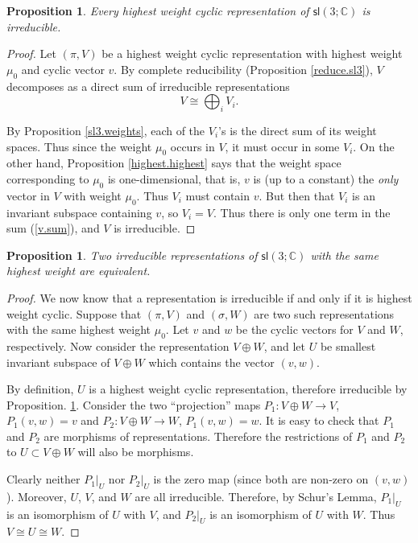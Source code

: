 \documentclass[12pt]{amsbook}
\theoremstyle{plain}
\newtheorem{proposition}[theorem]{Proposition}
\numberwithin{equation}{chapter}
\numberwithin{theorem}{chapter}
\begin{document}
\begin{proposition}
\label{highest.irred}Every highest weight cyclic representation of
$\mathsf{sl}\left(  3;\mathbb{C}\right)  $ is irreducible.
\end{proposition}

\begin{proof}
Let $\left(  \pi,V\right)  $ be a highest weight cyclic representation with
highest weight $\mu_{0}$ and cyclic vector $v$. By complete reducibility
(Proposition \ref{reduce.sl3}), $V$ decomposes as a direct sum of irreducible
representations
\begin{equation}
V\cong\bigoplus_{i}V_{i}\text{.}\label{v.sum}%
\end{equation}

By Proposition \ref{sl3.weights}, each of the $V_{i}$'s is the direct sum of
its weight spaces. Thus since the weight $\mu_{0}$ occurs in $V$, it must
occur in some $V_{i}$. On the other hand, Proposition \ref{highest.highest}
says that the weight space corresponding to $\mu_{0}$ is one-dimensional, that
is, $v$ is (up to a constant) the \textit{only} vector in $V$ with weight
$\mu_{0}$. Thus $V_{i}$ must contain $v$. But then that $V_{i}$ is an
invariant subspace containing $v$, so $V_{i}=V$. Thus there is only one term
in the sum (\ref{v.sum}), and $V$ is irreducible.
\end{proof}

\begin{proposition}
Two irreducible representations of $\mathsf{sl}\left(  3;\mathbb{C}\right)  $
with the same highest weight are equivalent.
\end{proposition}

\begin{proof}
We now know that a representation is irreducible if and only if it is highest
weight cyclic. Suppose that $\left(  \pi,V\right)  $ and $\left(
\sigma,W\right)  $ are two such representations with the same highest weight
$\mu_{0}$. Let $v$ and $w$ be the cyclic vectors for $V$ and $W$,
respectively. Now consider the representation $V\oplus W$, and let $U$ be
smallest invariant subspace of $V\oplus W$ which contains the vector $(v,w)$.

By definition, $U$ is a highest weight cyclic representation, therefore
irreducible by Proposition. \ref{highest.irred}. Consider the two
``projection'' maps $P_{1}:V\oplus W\rightarrow V$, $P_{1}(v,w)=v$ and
$P_{2}:V\oplus W\rightarrow W$, $P_{1}(v,w)=w$. It is easy to check that
$P_{1}$ and $P_{2}$ are morphisms of representations. Therefore the
restrictions of $P_{1}$ and $P_{2}$ to $U\subset V\oplus W$ will also be morphisms.

Clearly neither $\left.  P_{1}\right|  _{U}$ nor $\left.  P_{2}\right|  _{U}$
is the zero map (since both are non-zero on $\left(  v,w\right)  $). Moreover,
$U$, $V$, and $W$ are all irreducible. Therefore, by Schur's Lemma, $\left.
P_{1}\right|  _{U}$ is an isomorphism of $U$ with $V$, and $\left.
P_{2}\right|  _{U}$ is an isomorphism of $U$ with $W$. Thus $V\cong U\cong W$.
\end{proof}
\end{document}
